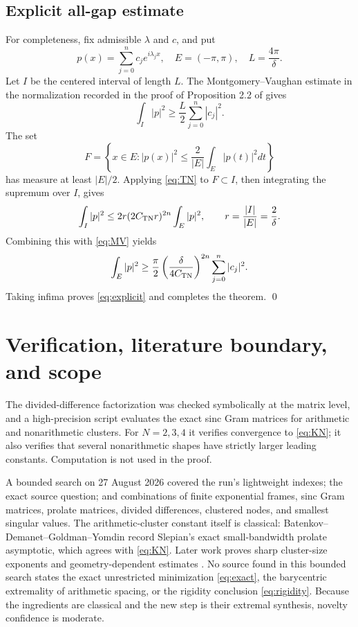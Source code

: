 \documentclass[11pt]{article}
\begin{document}
\subsection*{Explicit all-gap estimate}

For completeness, fix admissible $\lambda$ and $c$, and put
\[
 p(x)=\sum_{j=0}^{n}c_j e^{i\lambda_jx},\quad
 E=(-\pi,\pi),\quad L=\frac{4\pi}{\delta}.
\]
Let $I$ be the centered interval of length $L$.  The Montgomery--Vaughan estimate in the normalization recorded in the proof of Proposition 2.2 of \cite{BownikSpeegle} gives
\begin{equation}\label{eq:MV}
 \int_I|p|^2\geq\frac{L}{2}\sum_{j=0}^{n}|c_j|^2.
\end{equation}
The set
\[
 F=\left\{x\in E: |p(x)|^2\leq
 \frac{2}{|E|}\int_E|p(t)|^2dt\right\}
\]
has measure at least $|E|/2$.  Applying \eqref{eq:TN} to $F\subset I$, then integrating the supremum over $I$, gives
\[
 \int_I|p|^2
 \leq 2r(2C_{\rm TN}r)^{2n}\int_E|p|^2,
 \qquad r=\frac{|I|}{|E|}=\frac{2}{\delta}.
\]
Combining this with \eqref{eq:MV} yields
\[
 \int_E|p|^2\geq
 \frac{\pi}{2}\left(\frac{\delta}{4C_{\rm TN}}\right)^{2n}
 \sum_{j=0}^{n}|c_j|^2.
\]
Taking infima proves \eqref{eq:explicit} and completes the theorem. \qed

\section{Verification, literature boundary, and scope}

The divided-difference factorization was checked symbolically at the matrix level, and a high-precision script evaluates the exact sinc Gram matrices for arithmetic and nonarithmetic clusters.  For $N=2,3,4$ it verifies convergence to \eqref{eq:KN}; it also verifies that several nonarithmetic shapes have strictly larger leading constants.  Computation is not used in the proof.

A bounded search on 27 August 2026 covered the run's lightweight indexes; the exact source question; and combinations of finite exponential frames, sinc Gram matrices, prolate matrices, divided differences, clustered nodes, and smallest singular values.  The arithmetic-cluster constant itself is classical: Batenkov--Demanet--Goldman--Yomdin \cite{BatenkovEtAl} record Slepian's exact small-bandwidth prolate asymptotic, which agrees with \eqref{eq:KN}.  Later work proves sharp cluster-size exponents and geometry-dependent estimates \cite{BatenkovEtAl,KunisNagel,BatenkovGoldman}.  No source found in this bounded search states the exact unrestricted minimization \eqref{eq:exact}, the barycentric extremality of arithmetic spacing, or the rigidity conclusion \eqref{eq:rigidity}.  Because the ingredients are classical and the new step is their extremal synthesis, novelty confidence is moderate.
\end{document}
